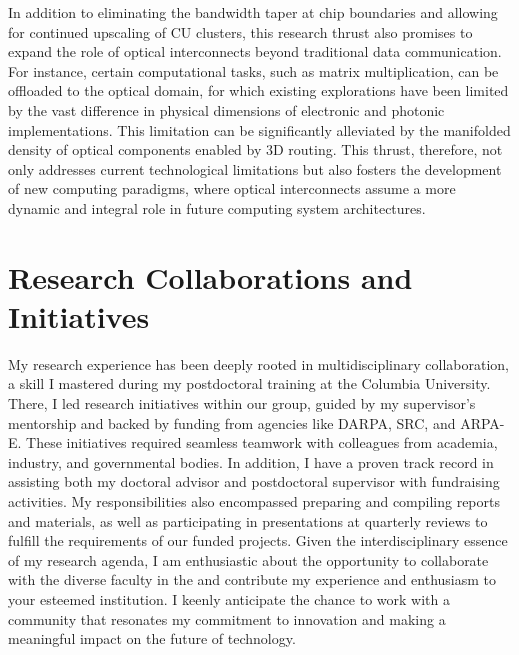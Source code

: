 In addition to eliminating the bandwidth taper at chip boundaries and allowing for continued upscaling of CU clusters, this research thrust also promises to expand the role of optical interconnects beyond traditional data communication. For instance, certain computational tasks, such as matrix multiplication, can be offloaded to the optical domain, for which existing explorations have been limited by the vast difference in physical dimensions of electronic and photonic implementations. This limitation can be significantly alleviated by the manifolded density of optical components enabled by 3D routing. This thrust, therefore, not only addresses current technological limitations but also fosters the development of new computing paradigms, where optical interconnects assume a more dynamic and integral role in future computing system architectures.



\section{Research Collaborations and Initiatives}

My research experience has been deeply rooted in multidisciplinary collaboration, a skill I mastered during my postdoctoral training at the Columbia University. There, I led research initiatives within our group, guided by my supervisor's mentorship and backed by funding from agencies like DARPA, SRC, and ARPA-E. These initiatives required seamless teamwork with colleagues from academia, industry, and governmental bodies. In addition, I have a proven track record in assisting both my doctoral advisor and postdoctoral supervisor with fundraising activities. My responsibilities also encompassed preparing and compiling reports and materials, as well as participating in presentations at quarterly reviews to fulfill the requirements of our funded projects. Given the interdisciplinary essence of my research agenda, I am enthusiastic about the opportunity to collaborate with the diverse faculty in the \appDept{} and contribute my experience and enthusiasm to your esteemed institution. I keenly anticipate the chance to work with a community that resonates my commitment to innovation and making a meaningful impact on the future of technology.